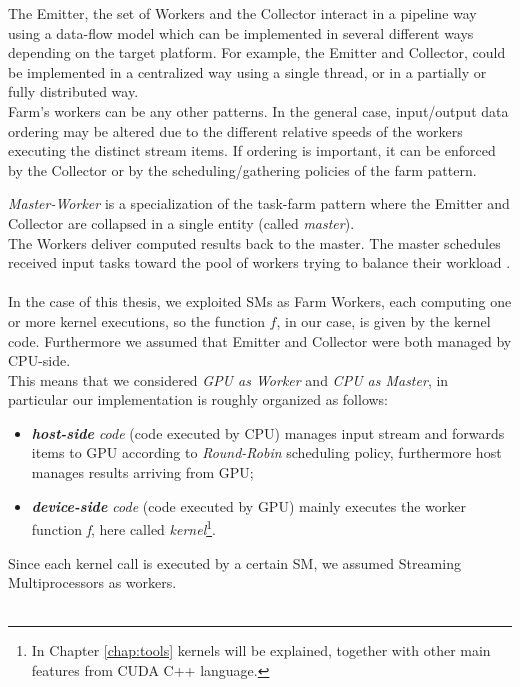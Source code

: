 	The Emitter, the set of Workers and the Collector interact in a pipeline way using a data-flow model which can be implemented in several different ways depending on the target platform.  For example, the Emitter and Collector, could be implemented in a centralized way using a single thread, or in a partially or fully distributed way.\\
	Farm's workers can be any other patterns.
	In the general case, input/output data ordering may be altered due to the different relative speeds of the workers executing the distinct stream items. If ordering is important, it can be enforced by the Collector or by the scheduling/gathering policies of the farm pattern.  
	
	\textit{Master-Worker} is a specialization of the task-farm pattern where the Emitter and Collector are collapsed in a single entity (called \textit{master}).\\
	The Workers deliver computed results back to the master. The master schedules received input tasks toward the pool of workers trying to balance their workload \cite{parpattbench}.\\\\
	
	In the case of this thesis, we exploited SMs as Farm Workers, each computing one or more kernel executions, so the function \(f\), in our case, is given by the kernel code. Furthermore we assumed that Emitter and Collector were both managed by CPU-side.\\
	This means that we considered \textit{GPU as Worker} and \textit{CPU as Master}, in particular our implementation is roughly organized as follows:
	\begin{itemize}
		\item \textit{\textbf{host-side} code} (code executed by CPU) manages input stream and forwards items to GPU according to \textit{Round-Robin} scheduling policy, furthermore host manages results arriving from GPU;
		\item \textit{\textbf{device-side} code} (code executed by GPU) mainly executes the worker function \textit{f}, here called \textit{kernel}\footnote{In Chapter \ref{chap:tools} kernels will be explained, together with other main features from CUDA C++ language.}.
	\end{itemize}
	Since each kernel call is executed by a certain SM, we assumed Streaming Multiprocessors as workers.\\\\
	
